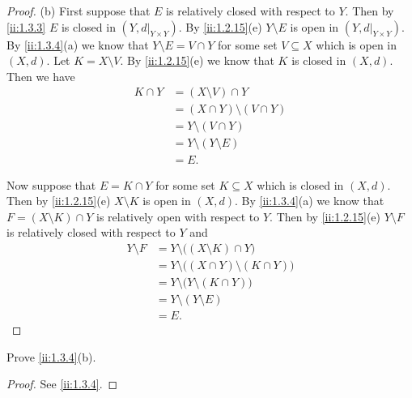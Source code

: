 \begin{proof}{(b)}
  First suppose that \(E\) is relatively closed with respect to \(Y\).
  Then by \cref{ii:1.3.3} \(E\) is closed in \((Y, d|_{Y \times Y})\).
  By \cref{ii:1.2.15}(e) \(Y \setminus E\) is open in \((Y, d|_{Y \times Y})\).
  By \cref{ii:1.3.4}(a) we know that \(Y \setminus E = V \cap Y\) for some set \(V \subseteq X\) which is open in \((X, d)\).
  Let \(K = X \setminus V\).
  By \cref{ii:1.2.15}(e) we know that \(K\) is closed in \((X, d)\).
  Then we have
  \begin{align*}
    K \cap Y & = (X \setminus V) \cap Y          \\
             & = (X \cap Y) \setminus (V \cap Y) \\
             & = Y \setminus (V \cap Y)          \\
             & = Y \setminus (Y \setminus E)     \\
             & = E.
  \end{align*}

  Now suppose that \(E = K \cap Y\) for some set \(K \subseteq X\) which is closed in \((X, d)\).
  Then by \cref{ii:1.2.15}(e) \(X \setminus K\) is open in \((X, d)\).
  By \cref{ii:1.3.4}(a) we know that \(F = (X \setminus K) \cap Y\) is relatively open with respect to \(Y\).
  Then by \cref{ii:1.2.15}(e) \(Y \setminus F\) is relatively closed with respect to \(Y\) and
  \begin{align*}
    Y \setminus F & = Y \setminus \big((X \setminus K) \cap Y\big)          \\
                  & = Y \setminus \big((X \cap Y) \setminus (K \cap Y)\big) \\
                  & = Y \setminus \big(Y \setminus (K \cap Y)\big)          \\
                  & = Y \setminus (Y \setminus E)                           \\
                  & = E.
  \end{align*}
\end{proof}

\exercisesection

\begin{ex}\label{ii:ex:1.3.1}
  Prove \cref{ii:1.3.4}(b).
\end{ex}

\begin{proof}
  See \cref{ii:1.3.4}.
\end{proof}
